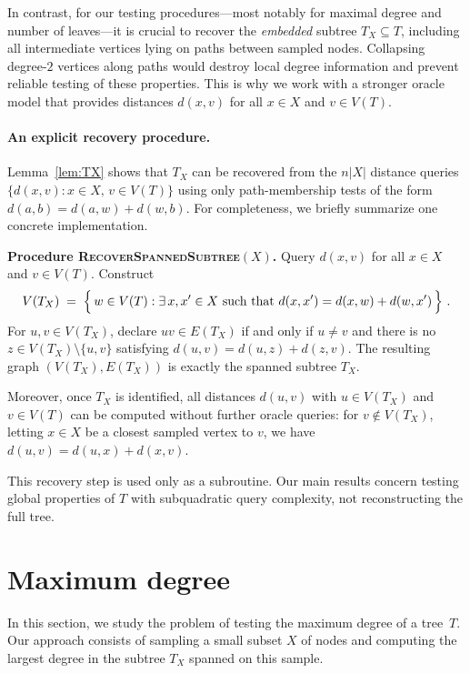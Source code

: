 \documentclass[12pt]{article}
\begin{document}
In contrast, for our testing procedures—most notably for maximal degree and number of leaves—it is crucial to recover the \emph{embedded} subtree $T_X\subseteq T$,
including all intermediate vertices lying on paths between sampled nodes.
Collapsing degree-$2$ vertices along paths would destroy local degree information
and prevent reliable testing of these properties.
This is why we work with a stronger oracle model that provides distances
$d(x,v)$ for all $x\in X$ and $v\in V(T)$.

\paragraph{An explicit recovery procedure.}
Lemma~\ref{lem:TX} shows that $T_X$ can be recovered from the $n|X|$ distance queries
$\{d(x,v): x\in X,\, v\in V(T)\}$ using only path-membership tests of the form
$d(a,b)=d(a,w)+d(w,b)$.
For completeness, we briefly summarize one concrete implementation.

\medskip
\noindent\textbf{Procedure \textsc{RecoverSpannedSubtree}$(X)$.}
Query $d(x,v)$ for all $x\in X$ and $v\in V(T)$.
Construct
\[
V(T_X) \;=\;\Bigl\{\,w\in V(T): \exists\,x,x'\in X
\ \text{such that}\ d(x,x')=d(x,w)+d(w,x')\,\Bigr\}~.
\]
For $u,v\in V(T_X)$, declare $uv\in E(T_X)$ if and only if $u\neq v$ and there is no
$z\in V(T_X)\setminus\{u,v\}$ satisfying $d(u,v)=d(u,z)+d(z,v)$.
The resulting graph $(V(T_X),E(T_X))$ is exactly the spanned subtree $T_X$.

Moreover, once $T_X$ is identified, all distances $d(u,v)$ with
$u\in V(T_X)$ and $v\in V(T)$ can be computed without further oracle queries:
for $v\notin V(T_X)$, letting $x\in X$ be a closest sampled vertex to $v$,
we have $d(u,v)=d(u,x)+d(x,v)$.

\medskip
This recovery step is used only as a subroutine.
Our main results concern testing global properties of $T$ with subquadratic query complexity,
not reconstructing the full tree.


\section{Maximum degree}\label{section: Testing maximal degrees}

In this section, we study the problem of testing the maximum degree of a tree~$T$. Our approach consists of sampling a small subset $X$ of nodes and computing the largest degree in the subtree $T_X$ spanned on this sample. 
\end{document}
